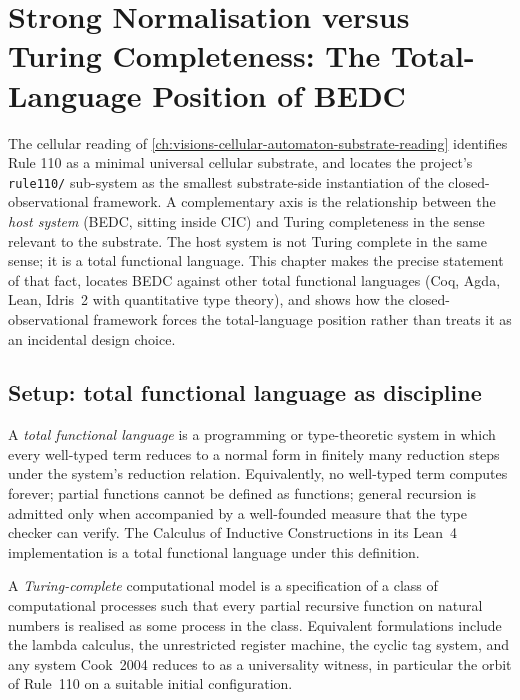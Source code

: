 \chapter{Strong Normalisation versus Turing Completeness: The Total-Language Position of BEDC}
\label{ch:visions-strong-normalization-vs-turing-completeness}

The cellular reading of \autoref{ch:visions-cellular-automaton-substrate-reading} identifies Rule 110 as a minimal universal cellular substrate, and locates the project's \texttt{rule110/} sub-system as the smallest substrate-side instantiation of the closed-observational framework. A complementary axis is the relationship between the \emph{host system} (BEDC, sitting inside CIC) and Turing completeness in the sense relevant to the substrate. The host system is not Turing complete in the same sense; it is a total functional language. This chapter makes the precise statement of that fact, locates BEDC against other total functional languages (Coq, Agda, Lean, Idris~2 with quantitative type theory), and shows how the closed-observational framework forces the total-language position rather than treats it as an incidental design choice.

\section{Setup: total functional language as discipline}
\label{sec:strong-normalization-setup}

\begin{definition}
\label{def:strong-normalization-total-functional-language}
A \emph{total functional language} is a programming or type-theoretic system in which every well-typed term reduces to a normal form in finitely many reduction steps under the system's reduction relation. Equivalently, no well-typed term computes forever; partial functions cannot be defined as functions; general recursion is admitted only when accompanied by a well-founded measure that the type checker can verify. The Calculus of Inductive Constructions in its Lean~4 implementation is a total functional language under this definition.
\end{definition}

\begin{definition}
\label{def:strong-normalization-turing-complete-model}
A \emph{Turing-complete} computational model is a specification of a class of computational processes such that every partial recursive function on natural numbers is realised as some process in the class. Equivalent formulations include the lambda calculus, the unrestricted register machine, the cyclic tag system, and any system Cook~2004 reduces to as a universality witness, in particular the orbit of Rule~110 on a suitable initial configuration.
\end{definition}

